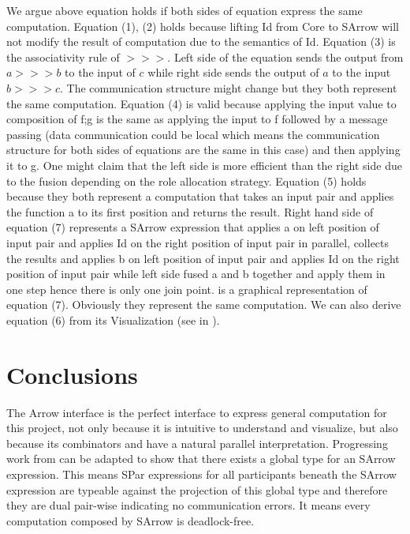 We argue above equation holds if both sides of equation express the same computation. Equation (1), (2) holds because lifting Id from Core to SArrow will not modify the result of computation due to the semantics of Id. Equation (3) is the associativity rule of $>>>$. Left side of the equation sends the output from $a >>> b$ to the input of $c$ while right side sends the output of $a$ to the input $b >>> c$. The communication structure might change but they both represent the same computation. Equation (4) is valid because applying the input value to composition of f;g is the same as applying the input to f followed by a message passing (data communication could be local which means the communication structure for both sides of equations are the same in this case) and then applying it to g. One might claim that the left side is more efficient than the right side due to the fusion depending on the role allocation strategy. Equation (5) holds because they both represent a computation that takes an input pair and applies the function a to its first position and returns the result. Right hand side of equation (7) represents a SArrow expression that applies a on left position of input pair and applies Id on the right position of input pair in parallel, collects the results and applies b on left position of input pair and applies Id on the right position of input pair while left side fused a and b together and apply them in one step hence there is only one join point.  is a graphical representation of equation (7). Obviously they represent the same computation. We can also derive equation (6) from its Visualization (see in ).

\section{Conclusions}
The Arrow interface is the perfect interface to express general computation for this pro\-ject, not only because it is intuitive to understand and visualize, but also because its combinators \hask{***} and \hask{&&&} have a natural parallel interpretation. Progressing work from \cite{AlgebraicMultipartyProtocol} can be adapted to show that there exists a global type for an SArrow expression. This means SPar expressions for all participants beneath the SArrow expression are typeable against the projection of this global type and therefore they are dual pair-wise indicating no communication errors. It means every computation composed by SArrow is deadlock-free.

